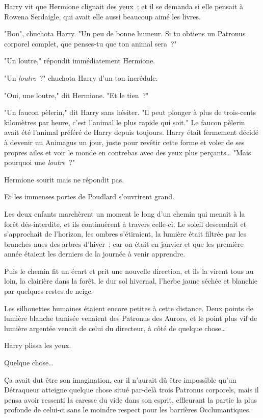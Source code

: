 Harry vit que Hermione clignait des yeux~; et il se demanda si elle pensait à Rowena Serdaigle, qui avait elle aussi beaucoup aimé les livres.

"Bon", chuchota Harry. "Un peu de bonne humeur. Si tu obtiens un Patronus corporel complet, que penses-tu que ton animal sera~?"

"Un loutre," répondit immédiatement Hermione.

"Un \emph{loutre}~?" chuchota Harry d'un ton incrédule.

"Oui, une loutre," dit Hermione. "Et le tien~?"

"Un faucon pèlerin," dit Harry sans hésiter. "Il peut plonger à plus de trois-cents kilomètres par heure, c'est l'animal le plus rapide qui soit." Le faucon pèlerin avait été l'animal préféré de Harry depuis toujours. Harry était fermement décidé à devenir un Animagus un jour, juste pour revêtir cette forme et voler de ses propres ailes et voir le monde en contrebas avec des yeux plus perçants… "Mais pourquoi une \emph{loutre}~?"

Hermione sourit mais ne répondit pas.

Et les immenses portes de Poudlard s'ouvrirent grand.

Les deux enfants marchèrent un moment le long d'un chemin qui menait à la forêt dés-interdite, et ils continuèrent à travers celle-ci. Le soleil descendait et s'approchait de l'horizon, les ombres s'étiraient, la lumière était filtrée par les branches nues des arbres d'hiver~; car on était en janvier et que les première année étaient les derniers de la journée à venir apprendre.

Puis le chemin fit un écart et prit une nouvelle direction, et ils la virent tous au loin, la clairière dans la forêt, le dur sol hivernal, l'herbe jaune séchée et blanchie par quelques restes de neige.

Les silhouettes humaines étaient encore petites à cette distance. Deux points de lumière blanche tamisée venaient des Patronus des Aurors, et le point plus vif de lumière argentée venait de celui du directeur, à côté de quelque chose…

Harry plissa les yeux.

Quelque chose…

Ça avait dut être son imagination, car il n'aurait dû être impossible qu'un Détraqueur atteigne quelque chose situé par-delà trois Patronus corporels, mais il pensa avoir ressenti la caresse du vide dans son esprit, effleurant la partie la plus profonde de celui-ci sans le moindre respect pour les barrières Occlumantiques.

